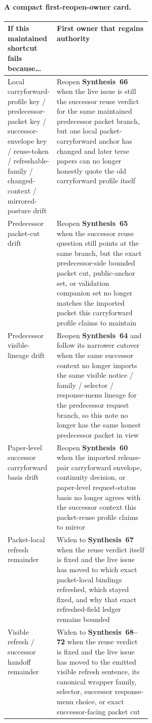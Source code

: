 \documentclass[11pt]{article}
\begin{document}
\paragraph{A compact first-reopen-owner card.}
\begin{table}[t]
\centering
\footnotesize
\begin{tabularx}{0.98\linewidth}{@{}p{0.33\linewidth}X@{}}
\toprule
If this maintained shortcut fails because\ldots & First owner that regains authority \\
\midrule
Local carryforward-profile key / predecessor-packet key / successor-envelope key / reuse-token / refreshable-family / changed-context / mirrored-posture drift & Reopen \textbf{Synthesis~66} when the live issue is still the successor reuse verdict for the same maintained predecessor packet branch, but one local packet-carryforward anchor has changed and later terse papers can no longer honestly quote the old carryforward profile itself \\
Predecessor packet-cut drift & Reopen \textbf{Synthesis~65} when the successor reuse question still points at the same branch, but the exact predecessor-side bounded packet cut, public-anchor set, or validation companion set no longer matches the imported packet this carryforward profile claims to maintain \\
Predecessor visible-lineage drift & Reopen \textbf{Synthesis~64} and follow its narrower cutover when the same successor context no longer imports the same visible notice / family / selector / response-menu lineage for the predecessor request branch, so this note no longer has the same honest predecessor packet in view \\
Paper-level successor carryforward basis drift & Reopen \textbf{Synthesis~60} when the imported release-pair carryforward envelope, continuity decision, or paper-level request-status basis no longer agrees with the successor context this packet-reuse profile claims to mirror \\
Packet-local refresh remainder & Widen to \textbf{Synthesis~67} when the reuse verdict itself is fixed and the live issue has moved to which exact packet-local bindings refreshed, which stayed fixed, and why that exact refreshed-field ledger remains bounded \\
Visible refresh / successor handoff remainder & Widen to \textbf{Synthesis~68--72} when the reuse verdict is fixed and the live issue has moved to the emitted visible refresh sentence, its canonical wrapper family, selector, successor response-menu choice, or exact successor-facing packet cut \\

\end{tabularx}
\end{table}
\end{document}
